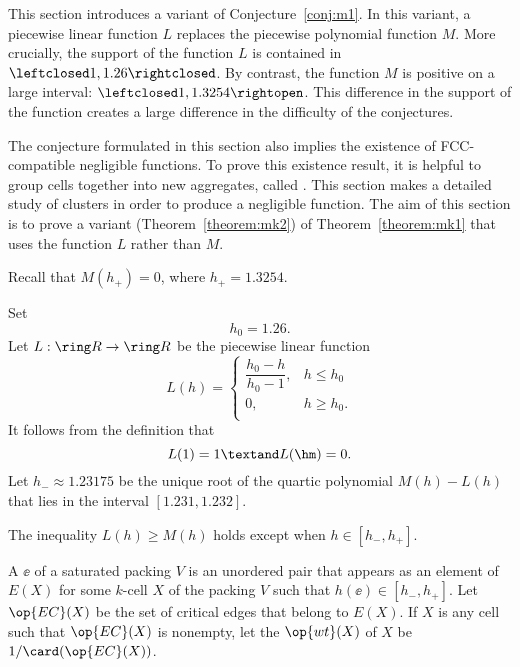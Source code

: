 \begin{cnl}
This section introduces a variant of 
Conjecture~\ref{conj:m1}.  In this variant, a piecewise linear
function $L$ replaces the piecewise polynomial function $M$.  More
crucially, the support of the function $L$ is contained in
$\leftclosed1,1.26\rightclosed$.  By contrast, the function $M$ is
positive on a large interval: $\leftclosed1,1.3254\rightopen$.  This
difference in the support of the function creates a large difference
in the difficulty of the conjectures.

The conjecture formulated in this section also implies the existence
of FCC-compatible negligible functions.  To prove this existence
result, it is helpful to group cells together into new
aggregates, called .  This section makes a detailed
study of clusters in order to produce a negligible function.
The aim of this section is to prove a variant
(Theorem~\ref{theorem:mk2}) of Theorem~\ref{theorem:mk1} that uses the
function $L$ rather than $M$.

Recall that $M(h_+) = 0$, where   $h_+ = 1.3254$.
%


\begin{definition}[$L$,~$h_0$,~$h_-$]
\label{def:L}
%
Set
\[  
h_0 = 1.26.%
\] 
Let $L:\Real\to\Real$ be the piecewise linear function 
\[  
L(h) = \begin{cases} 
\dfrac{h_0-h}{h_0-1}, & h \le h_0 \\
0, & h\ge h_0. \\
\end{cases}
\] 
It follows from the definition that
\[  
L(1) = 1\textand  L(\hm) = 0.
\] 
Let $h_- \approx 1.23175$ be the unique root of the quartic polynomial
$M(h)-L(h)$ that lies in the interval $[1.231,1.232]$.
\end{definition}

The inequality $L(h)\ge M(h)$ holds except when $h\in [h_-,h_+]$.

\figBJLIEKB %


\begin{definition}
\label{def:wt} 
%
A  $\ee$ of a saturated packing $V$ is an
unordered pair that appears as an element of $E(X)$ for some $k$-cell
$X$ of the packing $V$ such that $h(\ee)\in[h_-,h_+]$.  Let
$\op{EC}(X)$ be the set of critical edges that belong to $E(X)$.  If
$X$ is any cell such that $\op{EC}(X)$ is nonempty, let the
 $\op{wt}(X)$ of $X$ be $1/\card(\op{EC}(X))$.
\end{definition}



\end{cnl}
